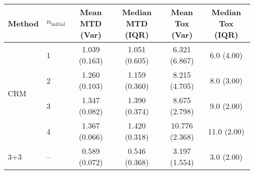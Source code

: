 \begin{tabular}{llcccc}
\toprule
Method & $n_{\text{initial}}$ & Mean MTD (Var)  & Median MTD (IQR)  & Mean Tox (Var)  & Median Tox (IQR)  \\
\midrule
\multirow{4}{*}{CRM} & 1 & 1.039 (0.163) & 1.051 (0.605) & 6.321 (6.867) & 6.0 (4.00) \\
 & 2 & 1.260 (0.103) & 1.159 (0.360) & 8.215 (4.705) & 8.0 (3.00) \\
 & 3 & 1.347 (0.082) & 1.390 (0.374) & 8.675 (2.798) & 9.0 (2.00) \\
 & 4 & 1.367 (0.066) & 1.420 (0.318) & 10.776 (2.368) & 11.0 (2.00) \\
\midrule
3+3 & -- & 0.589 (0.072) & 0.546 (0.368) & 3.197 (1.554) & 3.0 (2.00) \\
\bottomrule
\end{tabular}
